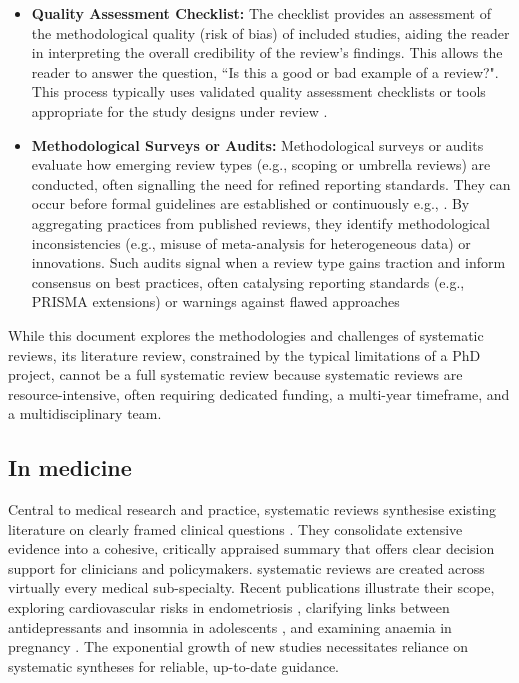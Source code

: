 \documentclass[10pt,oneside]{book}
\begin{document}
\begin{itemize}
    \item {\bf{Quality Assessment Checklist:}} The checklist provides an assessment of the methodological quality (risk of bias) of included studies, aiding the reader in interpreting the overall credibility of the review's findings. This allows the reader to answer the question, ``Is this a good or bad example of a review?". This process typically uses validated quality assessment checklists or tools appropriate for the study designs under review \cite{whiting_proposed_2017}.
    \item {\bf{Methodological Surveys or Audits:}} Methodological surveys or audits evaluate how emerging review types (e.g., scoping or umbrella reviews) are conducted, often signalling the need for refined reporting standards. They can occur before formal guidelines are established or continuously e.g., \cite{dalton_potential_2017, france_methodological_2014}. By aggregating practices from published reviews, they identify methodological inconsistencies (e.g., misuse of meta-analysis for heterogeneous data) or innovations. Such audits signal when a review type gains traction and inform consensus on best practices, often catalysing reporting standards (e.g., PRISMA extensions) or warnings against flawed approaches \cite{tricco_prisma_2018, sarkis-onofre_how_2021,rethlefsen_prisma-s_2021, rethlefsen_prisma-s_2021-1}
\end{itemize}

While this document explores the methodologies and challenges of systematic reviews, its literature review, constrained by the typical limitations of a PhD project, cannot be a full systematic review because systematic reviews are resource-intensive, often requiring dedicated funding, a multi-year timeframe, and a multidisciplinary team.
\subsection{In medicine}

Central to medical research and practice, systematic reviews synthesise existing literature on clearly framed clinical questions \cite{kranke_evidence-based_2010, higgins_cochrane_2019}. They consolidate extensive evidence into a cohesive, critically appraised summary that offers clear decision support for clinicians and policymakers. systematic reviews are created across virtually every medical sub-specialty. Recent publications illustrate their scope, exploring cardiovascular risks in endometriosis \cite{parsa_endometriosis_2025}, clarifying links between antidepressants and insomnia in adolescents \cite{turkmen_systematic_2025}, and examining anaemia in pregnancy \cite{azzam_anemia_2025}. The exponential growth of new studies necessitates reliance on systematic syntheses for reliable, up-to-date guidance.
\end{document}
